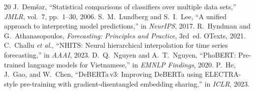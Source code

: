 \documentclass[conference]{IEEEtran}
\begin{document}
\begin{thebibliography}{20}
 J.~Dem\v{s}ar, ``Statistical comparisons of classifiers over multiple data sets,'' \emph{JMLR}, vol.~7, pp.~1--30, 2006.
 S.~M.~Lundberg and S.~I.~Lee, ``A unified approach to interpreting model predictions,'' in \emph{NeurIPS}, 2017.
 R.~Hyndman and G.~Athanasopoulos, \emph{Forecasting: Principles and Practice}, 3rd~ed. OTexts, 2021.
 C.~Challu \emph{et al.}, ``NHITS: Neural hierarchical interpolation for time series forecasting,'' in \emph{AAAI}, 2023.
 D.~Q.~Nguyen and A.~T.~Nguyen, ``PhoBERT: Pre-trained language models for Vietnamese,'' in \emph{EMNLP Findings}, 2020.
 P.~He, J.~Gao, and W.~Chen, ``DeBERTa\,v3: Improving DeBERTa using ELECTRA-style pre-training with gradient-disentangled embedding sharing,'' in \emph{ICLR}, 2023.
\end{thebibliography}
\end{document}

